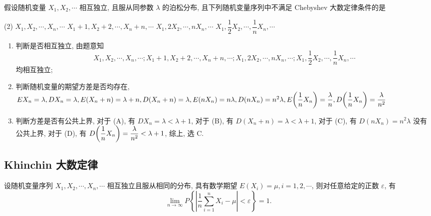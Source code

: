 \begin{example}
    假设随机变量 $X_1, X_2, \cdots $ 相互独立, 且服从同参数 $\lambda$ 的泊松分布, 且下列随机变量序列中不满足 Chebyshev 大数定律条件的是
    \begin{tasks}(2)
        \task $X_1, X_2, \cdots ,X_n, \cdots $
        \task $X_1+1, X_2+2, \cdots ,X_n+n, \cdots $
        \task $X_1, 2X_2, \cdots ,nX_n, \cdots $
        \task $X_1, \dfrac{1}{2}X_2, \cdots ,\dfrac{1}{n}X_n, \cdots $
    \end{tasks}
\end{example}
\begin{solution}
    \begin{enumerate}[label=(\arabic{*})]
        \item 判断是否相互独立,
              由题意知 $$X_1, X_2, \cdots ,X_n, \cdots ; X_1+1, X_2+2, \cdots ,X_n+n, \cdots ; X_1, 2X_2, \cdots ,nX_n, \cdots ; X_1, \dfrac{1}{2}X_2, \cdots ,\dfrac{1}{n}X_n, \cdots $$
              均相互独立;
        \item 判断随机变量的期望方差是否均存在,
        \begin{math}
            EX_n=\lambda, DX_n=\lambda, E(X_n+n)=\lambda+n, D(X_n+n)=\lambda,\\ 
            E(nX_n)=n\lambda, D(nX_n)=n^2\lambda, E\qty(\dfrac{1}{n}X_n)=\dfrac{\lambda}{n},D\qty(\dfrac{1}{n}X_n)=\dfrac{\lambda}{n^2}
        \end{math}
        \item 判断方差是否有公共上界, 
        对于 (A), 有 $DX_n=\lambda<\lambda+1$, 对于 (B), 有 $D(X_n+n)=\lambda<\lambda+1$, 对于 (C), 有 $D(nX_n)=n^2\lambda$ 没有公共上界, 对于 (D), 有 $D\qty(\dfrac{1}{n}X_n)=\dfrac{\lambda}{n^2}<\lambda+1$, 综上, 选 C.
    \end{enumerate}
\end{solution}

\subsection{Khinchin 大数定律}

\begin{theorem}
    \label{Khinchinslawoflargenumbers}
    设随机变量序列 $ X_{1}, X_{2}, \cdots, X_{n}, \cdots $ 相互独立且服从相同的分布, 具有数学期望 $ E\left(X_{i}\right)=\mu, i=1,2, \cdots $, 则对任意给定的正数 $ \varepsilon $, 有
    $$\lim _{n \rightarrow \infty} P\left\{\left|\frac{1}{n} \sum_{i=1}^{n} X_{i}-\mu\right|<\varepsilon\right\}=1 .$$
\end{theorem}


